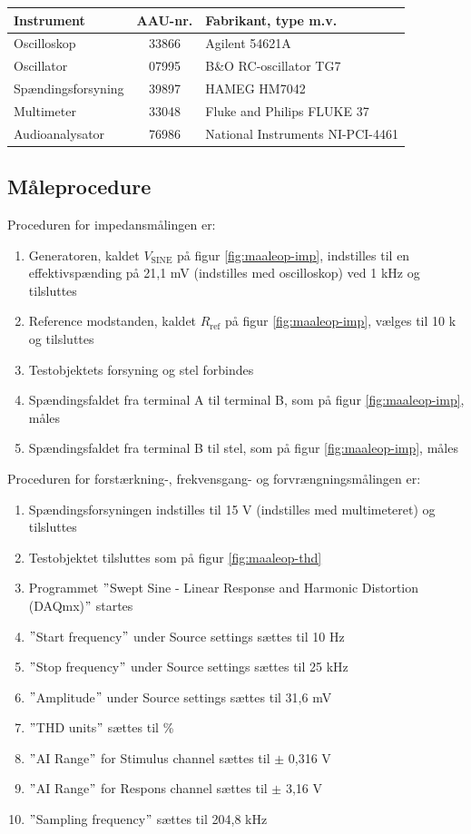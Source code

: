 \begin{table}[h]
\centering
\begin{tabular}{l|c|l}
\hline\hline
Instrument & AAU-nr. & Fabrikant, type m.v. \\
\hline\hline
Oscilloskop & 33866 & Agilent 54621A \\[4pt]
Oscillator & 07995 & B\&O RC-oscillator TG7 \\[4pt]
Spændingsforsyning & 39897 & HAMEG HM7042 \\[4pt]
Multimeter & 33048 & Fluke and Philips FLUKE 37 \\[4pt]
Audioanalysator & 76986 & National Instruments NI-PCI-4461 \\
\hline\hline
\end{tabular}
\label{tab:maaleudstyr_forforstaerker}
\end{table}

\subsection*{Måleprocedure}
Proceduren for impedansmålingen er:

\begin{enumerate}
\item Generatoren, kaldet $V_\mathrm{SINE}$ på figur \ref{fig:maaleop-imp}, indstilles til en effektivspænding på 21,1 mV (indstilles med oscilloskop) ved 1 kHz og tilsluttes
\item Reference modstanden, kaldet $R_\mathrm{ref}$ på figur \ref{fig:maaleop-imp}, vælges til 10 k\ohm~ og tilsluttes
\item Testobjektets forsyning og stel forbindes
\item Spændingsfaldet fra terminal A til terminal B, som på figur \ref{fig:maaleop-imp}, måles
\item Spændingsfaldet fra terminal B til stel, som på figur \ref{fig:maaleop-imp}, måles
\end{enumerate}

Proceduren for forstærkning-, frekvensgang- og forvrængningsmålingen er:

\begin{enumerate}
\item Spændingsforsyningen indstilles til 15 V (indstilles med multimeteret) og tilsluttes
\item Testobjektet tilsluttes som på figur \ref{fig:maaleop-thd}
\item Programmet $"$Swept Sine - Linear Response and Harmonic Distortion (DAQmx)$"$ startes
\item $"$Start frequency$"$ under Source settings sættes til 10 Hz
\item $"$Stop frequency$"$ under Source settings sættes til 25 kHz
\item $"$Amplitude$"$ under Source settings sættes til 31,6 mV
\item $"$THD units$"$ sættes til \%
\item $"$AI Range$"$ for Stimulus channel sættes til $\pm$ 0,316 V
\item $"$AI Range$"$ for Respons channel sættes til $\pm$ 3,16 V
\item $"$Sampling frequency$"$ sættes til 204,8 kHz
\end{enumerate}

